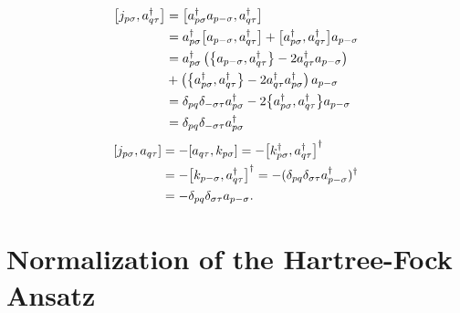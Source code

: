 \documentclass[10pt]{article}
\begin{document}
\begin{appendices}
\begin{align}
\label{kad}
\comm{j_{p\sigma}}{a^{\dagger}_{q\tau}}
&=
\comm{a^{\dagger}_{p\sigma}a_{p-\sigma}}{a^{\dagger}_{q\tau}}
\nonumber
\\
&=
a^{\dagger}_{p\sigma}\comm{a_{p-\sigma}}{a^{\dagger}_{q\tau}}
+
\comm{a^{\dagger}_{p\sigma}}{a^{\dagger}_{q\tau}}a_{ p-\sigma}
\nonumber
\\
&=
a^{\dagger}_{p\sigma}\left(\acomm{a_{p-\sigma}}{a^{\dagger}_{q\tau}}-2a^{\dagger}_{q\tau}a_{p-\sigma}\right)
\nonumber
\\
&+
\left(\acomm{a^{\dagger}_{p\sigma}}{a^{\dagger}_{q\tau}}-2a^{\dagger}_{q\tau}a^{\dagger}_{p\sigma}\right)a_{p-\sigma}
\nonumber
\\
&=
\delta_{pq}\delta_{-\sigma\tau}a^{\dagger}_{p\sigma}-2\acomm{a^{\dagger}_{p\sigma}}{a^{\dagger}_{q\tau}}a_{p-\sigma}
\nonumber
\\
&=
\delta_{pq}\delta_{-\sigma\tau}a^{\dagger}_{p\sigma}
\end{align}
\begin{align}
\label{ka}
\comm{j_{p\sigma}}{a_{q\tau}}
\nonumber
&=
-\comm{a_{q\tau}}{k_{p\sigma}}
\nonumber
=
-\comm{k_{p\sigma}^{\dagger}}{a^{\dagger}_{q\tau}}^{\dagger}
\nonumber
\\
&=
-\comm{k_{p-\sigma}}{a^{\dagger}_{q\tau}}^{\dagger}
\nonumber
=
-(\delta_{pq}\delta_{\sigma\tau}a^{\dagger}_{p-\sigma})^{\dagger}
\nonumber
\\
&=
-\delta_{pq}\delta_{\sigma\tau}a_{p-\sigma}
.\end{align}

\chapter{Normalization of the Hartree-Fock Ansatz}
\label{appendix:normalization_of_the_hartree-fock_ansatz}


\end{appendices}
\end{document}
